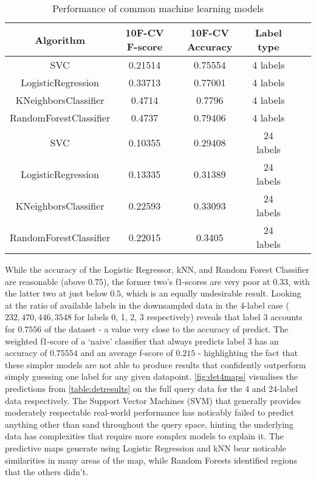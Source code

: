 \begin{table}
    \centering
\begin{tabular}{|c|c|c|c|c|c|}
    \hline
    Algorithm & 10F-CV F-score & 10F-CV Accuracy & Label type\\\hline
    SVC & 0.21514 & 0.75554 & 4 labels \\
    LogisticRegression & 0.33713 & 0.77001 & 4 labels \\
    KNeighborsClassifier & 0.4714 & 0.7796 & 4 labels \\
    RandomForestClassifier & 0.4737 & 0.79406 & 4 labels \\
    SVC & 0.10355 & 0.29408 & 24 labels \\
    LogisticRegression & 0.13335 & 0.31389 & 24 labels \\
    KNeighborsClassifier & 0.22593 & 0.33093 & 24 labels \\
    RandomForestClassifier & 0.22015 & 0.3405 & 24 labels \\
    \hline
\end{tabular}
\label{table:detresults}
    \caption{Performance of common machine learning models}
\end{table}

While the accuracy of the Logistic Regressor, kNN, and Random Forest Classifier are reasonable (above $0.75$), the former two's f1-scores are very poor at $0.33$, with the latter two at just below $0.5$, which is an equally undesirable result. Looking at the ratio of available labels in the downsampled data in the 4-label case ($232,  470,  446, 3548$ for labels 0, 1, 2, 3 respectively) reveals that label 3 accounts for $0.7556$ of the dataset - a value very close to the accuracy of predict. The weighted f1-score of a `naive' classifier that always predicts label 3 has an accuracy of  $0.75554$ and an average f-score of $0.215$ - highlighting the fact that these simpler models are not able to produce results that confidently outperform simply guessing one label for any given datapoint. \autoref{fig:det4maps} visualises the predictions from \autoref{table:detresults} on the full query data for the 4 and 24-label data respectively. The Support Vector Machines (SVM) that generally provides moderately respectable real-world performance has noticably failed to predict anything other than sand throughout the query space, hinting the underlying data has complexities that require more complex models to explain it. The predictive maps generate using Logistic Regression and kNN bear noticable similarities in many areas of the map, while Random Forests identified regions that the others didn't. 

